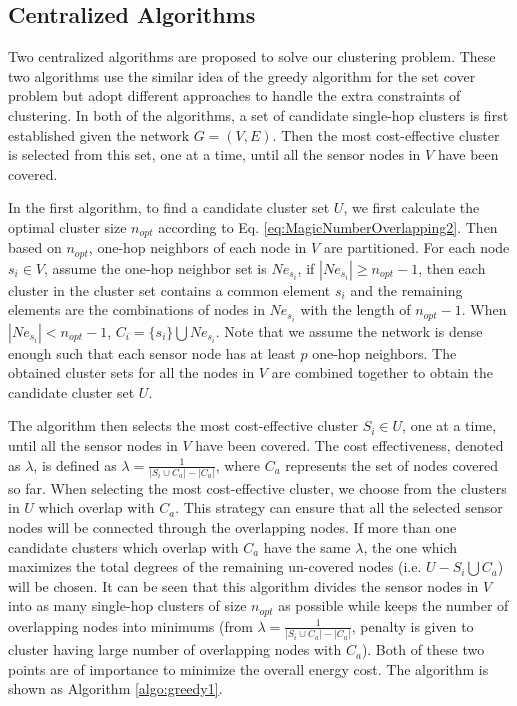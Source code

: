 \subsection{Centralized Algorithms}
\label{sec:centralizedsolution}
Two centralized algorithms are proposed to solve our clustering problem. These two algorithms use the similar idea of the greedy algorithm for the set cover problem but adopt different approaches to handle the extra constraints of clustering. In both of the algorithms, a set of candidate single-hop clusters is first established given the network  \(G =(V,E)\). Then the most cost-effective cluster is selected from this set, one at a time, until all the sensor nodes in \(V\) have been covered.  

In the first algorithm, to find a candidate cluster set \(U\), we first calculate the optimal cluster size \(n_{opt}\) according to Eq. \ref{eq:MagicNumberOverlapping2}. Then based on \(n_{opt}\), one-hop neighbors of each node in \(V\) are partitioned. For each node \(s_i \in V\), assume the one-hop neighbor set is \(Ne_{s_i}\), if \( \left|Ne_{s_i}\right| \geq n_{opt}-1\), then each cluster in the cluster set contains a common element \(s_i\) and the remaining elements are the combinations of nodes in \(Ne_{s_i}\) with the length of \(n_{opt}-1\). When \(\left|Ne_{s_i}\right| < n_{opt} -1\), \(C_i =\{s_i\} \bigcup Ne_{s_i}\). Note that we assume the network is dense enough such that each sensor node has at least \(p\) one-hop neighbors. The obtained cluster sets for all the nodes in \(V\) are combined together to obtain the candidate cluster set \(U\).

The algorithm then selects the most cost-effective cluster \(S_i \in U\), one at a time, until all the sensor nodes in \(V\) have been covered. The cost effectiveness, denoted as \(\lambda\), is defined as \(\lambda = \frac{1}{\left|S_i\cup C_a\right| - \left|C_a\right|}\), where \(C_a\) represents the set of nodes covered so far. When selecting the most cost-effective cluster, we choose from the clusters in \(U\) which overlap with \(C_a\). This strategy can ensure that all the selected sensor nodes will be connected through the overlapping nodes.  If more than one candidate clusters which overlap with \(C_a\) have the same \(\lambda\), the one which maximizes the total degrees of the remaining un-covered nodes (i.e. \(U- S_i\bigcup C_a\)) will be chosen. It can be seen that this algorithm divides the sensor nodes in \(V\) into as many single-hop clusters of size \(n_{opt}\) as possible while keeps the number of overlapping nodes into minimums (from \(\lambda = \frac{1}{\left|S_i\cup C_a\right| - \left|C_a\right|}\), penalty is given to cluster having large number of overlapping nodes with \(C_a\)). Both of these two points are of importance to minimize the overall energy cost. The algorithm is shown as Algorithm \ref{algo:greedy1}.

